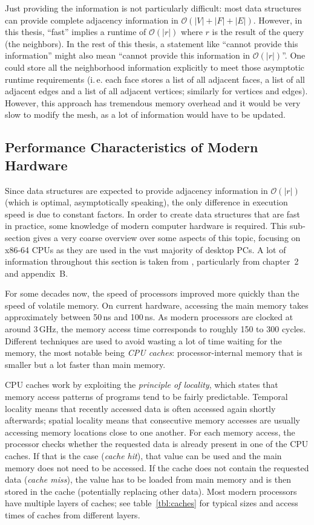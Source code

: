 Just providing the information is not particularly difficult:
most data structures can provide complete adjacency information in $\mathcal O(|V| + |F| + |E|)$.
However, in this thesis, \enquote{fast} implies a runtime of $\mathcal O(|r|)$ where $r$ is the result of the query (the neighbors). In the rest of this thesis, a statement like \enquote{cannot provide this information} might also mean \enquote{cannot provide this information in $\mathcal O(|r|)$}.
One could store all the neighborhood information explicitly to meet those asymptotic runtime requirements (i.\,e. each face stores a list of all adjacent faces, a list of all adjacent edges and a list of all adjacent vertices; similarly for vertices and edges).
However, this approach has tremendous memory overhead and it would be very slow to modify the mesh, as a lot of information would have to be updated.

\subsection{Performance Characteristics of Modern Hardware}

Since data structures are expected to provide adjacency information in $\mathcal O(|r|)$ (which is optimal, asymptotically speaking), the only difference in execution speed is due to constant factors.
In order to create data structures that are fast in practice, some knowledge of modern computer hardware is required.
This sub-section gives a very coarse overview over some aspects of this topic, focusing on x86-64 CPUs as they are used in the vast majority of desktop PCs.
A lot of information throughout this section is taken from \cite{hennessy2017computer}, particularly from chapter~2 and appendix~B.

For some decades now, the speed of processors improved more quickly than the speed of volatile memory.
On current hardware, accessing the main memory takes approximately between 50\,ns and 100\,ns.
As modern processors are clocked at around 3\,GHz, the memory access time corresponds to roughly 150 to 300 cycles.
Different techniques are used to avoid wasting a lot of time waiting for the memory, the most notable being \emph{CPU caches}: processor-internal memory that is smaller but a lot faster than main memory.

CPU caches work by exploiting the \emph{principle of locality}, which states that memory access patterns of programs tend to be fairly predictable.
Temporal locality means that recently accessed data is often accessed again shortly afterwards;
spatial locality means that consecutive memory accesses are usually accessing memory locations close to one another.
For each memory access, the processor checks whether the requested data is already present in one of the CPU caches.
If that is the case (\emph{cache hit}), that value can be used and the main memory does not need to be accessed.
If the cache does not contain the requested data (\emph{cache miss}), the value has to be loaded from main memory and is then stored in the cache (potentially replacing other data).
Most modern processors have multiple layers of caches; see table~\ref{tbl:caches} for typical sizes and access times of caches from different layers.

